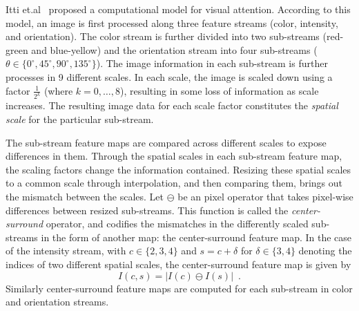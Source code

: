 \documentclass {udthesis}
\begin{document}
Itti et.al~\cite{itti} proposed a computational model for visual attention.
According to this model, an image is first processed along three feature streams 
(color, intensity, and orientation).  
The color stream is further divided into two sub-streams (red-green and blue-yellow) and 
the orientation stream into four sub-streams 
($\theta \in \{0^\circ, 45^\circ, 90^\circ, 135^\circ\}$).
The image information in each sub-stream is further processes in 9 different scales.
In each scale, the image is scaled down using a factor $\frac{1}{2^k}$ (where $k = 0,\ldots,8$),
resulting in some loss of information as scale increases.
The resulting image data for each scale factor constitutes the
\emph{spatial scale} for the particular sub-stream.

The sub-stream feature maps are compared across different scales to expose
differences in them. Through the spatial scales in each sub-stream feature map, the scaling factors change the information
contained. Resizing these spatial scales to a common scale through interpolation, and then comparing them, brings out 
the mismatch between the scales.
Let $\ominus$ be an pixel operator that takes pixel-wise differences between resized sub-streams.  This function is called the \emph{center-surround} operator, and codifies the mismatches in the differently scaled sub-streams in the form of another map: the center-surround feature map.  In the case of
the intensity stream, with $c\in\{2,3,4\}$ and $s=c+\delta$ for $\delta \in \{3,4\}$ denoting the indices of two different spatial scales, the center-surround feature map is given by
%
\begin{equation} \label{intensity-CS}
 I(c,s)=\left|I(c)\ominus I(s)\right| \enspace.
\end{equation}
%
Similarly center-surround feature maps are computed for each sub-stream 
in color and orientation streams. 
\end{document}
